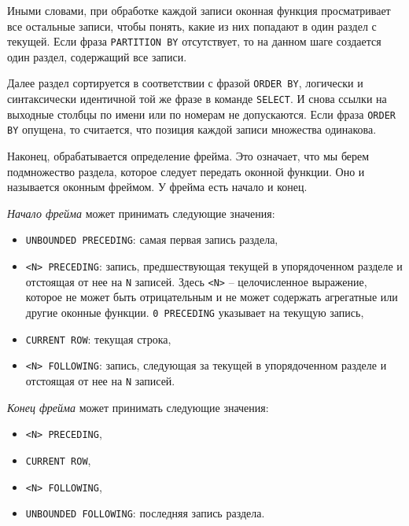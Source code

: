 \documentclass[%
	11pt,
	a4paper,
	utf8,
		]{article}
\begin{document}
Иными словами, при обработке каждой записи оконная функция просматривает все остальные записи, чтобы понять, какие из них попадают в один раздел с текущей. Если фраза \texttt{PARTITION BY} отсутствует, то на данном шаге создается один раздел, содержащий все записи.

Далее раздел сортируется в соответствии с фразой \texttt{ORDER BY}, логически и синтаксически идентичной той же фразе в команде \texttt{SELECT}. И снова ссылки на выходные столбцы по имени или по номерам не допускаются. Если фраза \texttt{ORDER BY} опущена, то считается, что позиция каждой записи множества одинакова.

Наконец, обрабатывается определение фрейма. Это означает, что мы берем подмножество раздела, которое следует передать оконной функции. Оно и называется оконным фреймом. У фрейма есть начало и конец.

\emph{Начало фрейма} может принимать следующие значения:
\begin{itemize}
	\item \texttt{UNBOUNDED PRECEDING}: самая первая запись раздела,
	
	\item \texttt{<N> PRECEDING}: запись, предшествующая текущей в упорядоченном разделе и отстоящая от нее на \texttt{N} записей. Здесь \texttt{<N>} -- целочисленное выражение, которое не может быть отрицательным и не может содержать агрегатные или другие оконные функции. \texttt{0 PRECEDING} указывает на текущую запись,
	
	\item \texttt{CURRENT ROW}: текущая строка,
	
	\item \texttt{<N> FOLLOWING}: запись, следующая за текущей в упорядоченном разделе и отстоящая от нее на \texttt{N} записей.
\end{itemize}

\emph{Конец фрейма} может принимать следующие значения:
\begin{itemize}
	\item \texttt{<N> PRECEDING},
	
	\item \texttt{CURRENT ROW},
	
	\item \texttt{<N> FOLLOWING},
	
	\item \texttt{UNBOUNDED FOLLOWING}: последняя запись раздела.
\end{itemize}
\end{document}
